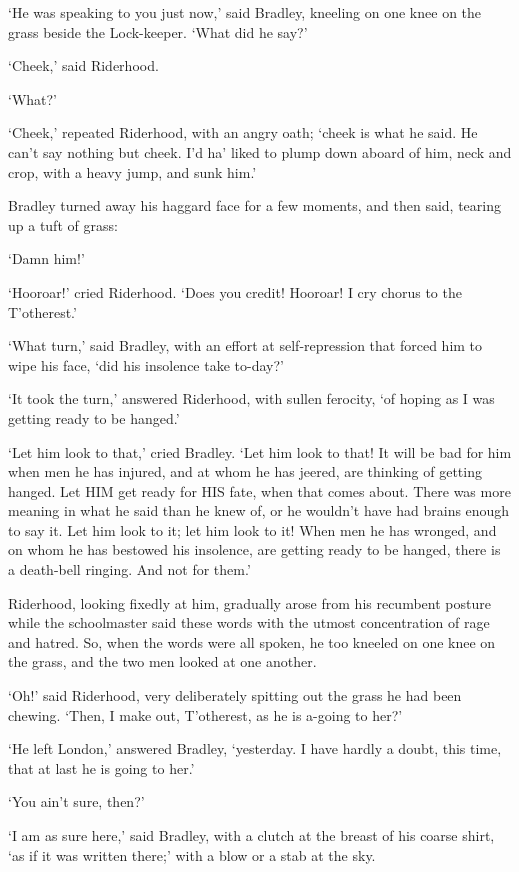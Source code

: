 ‘He was speaking to you just now,’ said Bradley, kneeling on one knee on
the grass beside the Lock-keeper. ‘What did he say?’

‘Cheek,’ said Riderhood.

‘What?’

‘Cheek,’ repeated Riderhood, with an angry oath; ‘cheek is what he said.
He can’t say nothing but cheek. I’d ha’ liked to plump down aboard of
him, neck and crop, with a heavy jump, and sunk him.’

Bradley turned away his haggard face for a few moments, and then said,
tearing up a tuft of grass:

‘Damn him!’

‘Hooroar!’ cried Riderhood. ‘Does you credit! Hooroar! I cry chorus to
the T’otherest.’

‘What turn,’ said Bradley, with an effort at self-repression that forced
him to wipe his face, ‘did his insolence take to-day?’

‘It took the turn,’ answered Riderhood, with sullen ferocity, ‘of hoping
as I was getting ready to be hanged.’

‘Let him look to that,’ cried Bradley. ‘Let him look to that! It will
be bad for him when men he has injured, and at whom he has jeered, are
thinking of getting hanged. Let HIM get ready for HIS fate, when that
comes about. There was more meaning in what he said than he knew of, or
he wouldn’t have had brains enough to say it. Let him look to it; let
him look to it! When men he has wronged, and on whom he has bestowed
his insolence, are getting ready to be hanged, there is a death-bell
ringing. And not for them.’

Riderhood, looking fixedly at him, gradually arose from his recumbent
posture while the schoolmaster said these words with the utmost
concentration of rage and hatred. So, when the words were all spoken,
he too kneeled on one knee on the grass, and the two men looked at one
another.

‘Oh!’ said Riderhood, very deliberately spitting out the grass he had
been chewing. ‘Then, I make out, T’otherest, as he is a-going to her?’

‘He left London,’ answered Bradley, ‘yesterday. I have hardly a doubt,
this time, that at last he is going to her.’

‘You ain’t sure, then?’

‘I am as sure here,’ said Bradley, with a clutch at the breast of his
coarse shirt, ‘as if it was written there;’ with a blow or a stab at the
sky.


